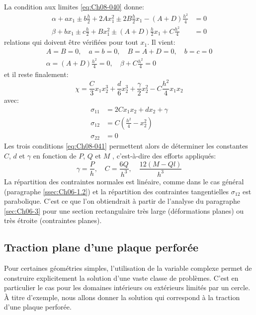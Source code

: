 La condition aux limites \eqref{eq:Ch08-040} donne: 
\begin{equation}
  \begin{aligned}
    \alpha +a x_1 \pm b \frac{h}{2} + 2 A x_1^2 \pm 2 B \frac{h}{2} x_1 - (A+D)\frac{h^2}{4} & = 0 \\
    \beta +b x_1 \pm c \frac{h}{2} + B x_1^2 \pm (A+D) \frac{h}{2} x_1 + C \frac{h^2}{4}&=0
  \end{aligned}
    \label{eq:Ch08-042}
\end{equation}
relations qui doivent être vérifiées pour tout $x_1$.
Il vient:
\begin{equation}
  \begin{aligned}
    A = B = 0, \quad a = b =0, \quad B = A+D =0, \quad b = c =0\\
    \alpha=(A+D)\frac{h^2}{4}=0, \quad \beta + C \frac{h^2}{4} =0
  \end{aligned}
    \label{eq:Ch08-043}
\end{equation}
et il reste finalement:
\begin{equation}
  \chi = \frac{C}{3} x_1 x_2^3 + \frac{d}{6} x_2^3 +\frac{\gamma}{2} x_2^2 - C\frac{h^2}{4} x_1 x_2
    \label{eq:Ch08-044}
\end{equation}
avec:
\begin{equation}
  \begin{aligned}
    \sigma_{11} & = 2 C x_1 x_2 + d x_2 + \gamma \\
    \sigma_{12} & = C (\frac{h^2}{4} - x_2^2) \\
    \sigma_{22} & = 0
  \end{aligned}
    \label{eq:Ch08-045}
\end{equation}
Les trois conditions \eqref{eq:Ch08-041} permettent alors de déterminer les constantes $C$, $d$ et $\gamma$ en fonction de $P$, $Q$ et $M$ , c'est-à-dire des efforts appliqués: 
\begin{equation}
  \gamma = \frac{P}{h}, \quad C = \frac{6Q}{h^3}, \quad \frac{12(M-Ql)}{h^3}
    \label{eq:Ch08-044}
\end{equation}
La répartition des contraintes normales est linéaire, comme dans le cas général (paragraphe \ref{ssec:Ch06-1.2}) et la répartition des contraintes tangentielles $\sigma_{12}$ est parabolique. C'est ce que l'on obtiendrait à partir de l'analyse du paragraphe \ref{sec:Ch06-3} pour une section rectangulaire très large (déformations planes) ou très étroite (contraintes planes). 

\subsection{Traction plane d'une plaque perforée}\label{ssec:Ch08-2.2}
Pour certaines géométries simples, l'utilisation de la variable complexe permet de construire explicitement la solution d'une vaste classe de problèmes. 
C'est en particulier le cas pour les domaines intérieurs ou extérieurs limités par un cercle. 
À titre d'exemple, nous allons donner la solution qui correspond à la traction d'une plaque perforée. 

